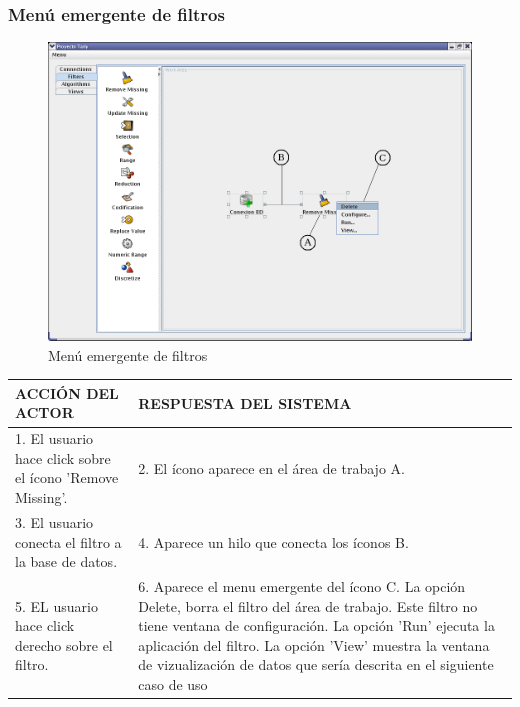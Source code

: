 \subsubsection{Men\'u emergente de filtros}
\begin{figure}[ht]
\centering
\includegraphics[width=1\textwidth]{images/f1.png}
\caption{Men\'u emergente de filtros}
\end{figure}
\begin{center}
\begin{tabular}{|p{60mm}|p{60mm}|} \hline
ACCI\'ON DEL ACTOR & RESPUESTA DEL SISTEMA \\ \hline
1. El usuario hace click sobre el \'icono 'Remove Missing'. & 2. El \'icono aparece en el \'area de trabajo A.\\ \hline
3. El usuario conecta el filtro a la base de datos. & 4. Aparece un hilo que conecta los \'iconos B.\\ \hline
5. EL usuario hace click derecho sobre el filtro. & 6. Aparece el menu emergente del \'icono C. La opci\'on Delete, borra el filtro del \'area de trabajo. Este filtro no tiene ventana de configuraci\'on. La opci\'on 'Run' ejecuta la aplicaci\'on del filtro. La opci\'on 'View' muestra la ventana de vizualizaci\'on de datos que ser\'ia descrita en el siguiente caso de uso\\ \hline
\end{tabular}
\end{center}

\newpage
